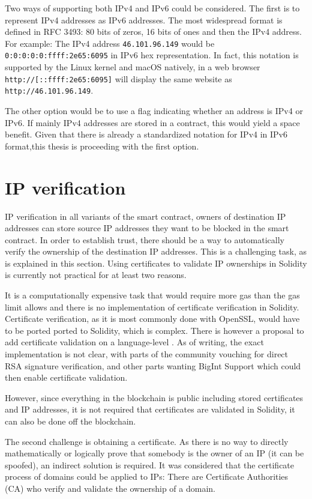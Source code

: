 Two ways of supporting both IPv4 and IPv6 could be considered.
The first is to represent IPv4 addresses as IPv6 addresses. The most widespread format is defined in RFC 3493: 80 bits of zeros, 16 bits of ones and then the IPv4 address. For example: The IPv4 address \texttt{46.101.96.149} would be \texttt{0:0:0:0:0:ffff:2e65:6095} in IPv6 hex representation. In fact, this notation is supported by the Linux kernel and macOS natively, in a web browser \texttt{http://[::ffff:2e65:6095]} will display the same website as \texttt{http://46.101.96.149}.

The other option would be to use a flag indicating whether an address is IPv4 or IPv6. If mainly IPv4 addresses are stored in a contract, this would yield a space benefit.
Given that there is already a standardized notation for IPv4 in IPv6 format,this thesis is proceeding with the first option.

\section{IP verification}
IP verification in all variants of the smart contract, owners of destination IP addresses can store source IP addresses they want to be blocked in the smart contract. In order to establish trust, there should be a way to automatically verify the ownership of the destination IP addresses. This is a challenging task, as is explained in this section. Using certificates to validate IP ownerships in Solidity is currently not practical for at least two reasons.

It is a computationally expensive task that would require more gas than the gas limit allows and there is no implementation of certificate verification in Solidity. Certificate verification, as it is most commonly done with OpenSSL, would have to be ported ported to Solidity, which is complex.
There is however a proposal to add certificate validation on a language-level \cite{EIP74}. As of writing, the exact implementation is not clear, with parts of the community vouching for direct RSA signature verification, and other parts wanting BigInt Support which could then enable certificate validation.

However, since everything in the blockchain is public including stored certificates and IP addresses, it is not required that certificates are validated in Solidity, it can also be done off the blockchain. 

The second challenge is obtaining a certificate. As there is no way to directly mathematically or logically prove that somebody is the owner of an IP (it can be spoofed), an indirect solution is required. It was considered that the certificate process of domains could be applied to IPs: There are Certificate Authorities (CA) who verify and validate the ownership of a domain.

